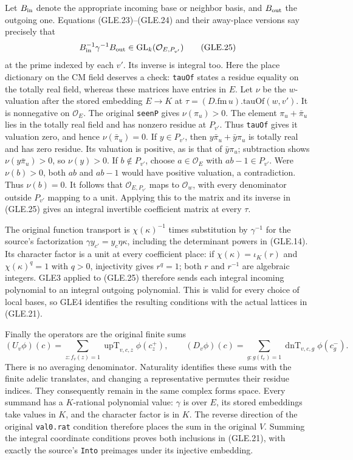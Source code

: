 Let $B_{\rm in}$ denote the appropriate incoming base or neighbor
basis, and $B_{\rm out}$ the outgoing one.  Equations (GLE.23)--(GLE.24)
and their away-place versions say precisely that
\[
       B_{\rm in}^{-1}\gamma^{-1}B_{\rm out}
                \in\mathrm{GL}_k(\mathcal O_{E,P_{v'}})
 \tag{GLE.25}
\]
at the prime indexed by each $v'$.  Its inverse is integral too.
Here the place dictionary on the CM field deserves a check:
\texttt{tauOf} states a residue equality on the totally real field,
whereas these matrices have entries in $E$.  Let $\nu$ be the
$w$-valuation after the stored embedding $E\to K$ at
$\tau=(D.\mathrm{fm}\,u).\mathrm{tauOf}(w,v')$.  It is nonnegative on
$\mathcal O_E$.  The original \texttt{seenP} gives $\nu(\pi_u)>0$.
The element $\pi_u+\bar\pi_u$ lies in the totally real field and has
nonzero residue at $P_{v'}$.  Thus \texttt{tauOf} gives it valuation
zero, and hence $\nu(\bar\pi_u)=0$.  If $y\in P_{v'}$, then
$y\bar\pi_u+\bar y\pi_u$ is totally real and has zero residue.
Its valuation is positive, as is that of $\bar y\pi_u$; subtraction
shows $\nu(y\bar\pi_u)>0$, so $\nu(y)>0$.
If $b\notin P_{v'}$, choose $a\in\mathcal O_E$ with
$ab-1\in P_{v'}$.  Were $\nu(b)>0$, both $ab$ and $ab-1$ would have
positive valuation, a contradiction.  Thus $\nu(b)=0$.
It follows that $\mathcal O_{E,P_{v'}}$ maps to $\mathcal O_w$,
with every denominator outside $P_{v'}$ mapping to a unit.  Applying
this to the matrix and its inverse in (GLE.25) gives an integral
invertible coefficient matrix at every $\tau$.

The original function transport is
$\chi(\kappa)^{-1}$ times substitution by $\gamma^{-1}$ for the
source's factorization $\gamma y_{c'}=y_c\eta\kappa$, including
the determinant powers in (GLE.14).  Its character factor is a unit
at every coefficient place: if $\chi(\kappa)=\iota_K(r)$ and
$\chi(\kappa)^q=1$ with $q>0$, injectivity gives $r^q=1$;
both $r$ and $r^{-1}$ are algebraic integers.  GLE3 applied to
(GLE.25) therefore sends each integral incoming polynomial to an
integral outgoing polynomial.  This is valid for every choice of
local bases, so GLE4 identifies the resulting conditions with the
actual lattices in (GLE.21).

Finally the operators are the original finite sums
\[
 (U_v\phi)(c)=\sum_{z:f_v(z)=1}\operatorname{upT}_{v,c,z}
                         \phi(c^+_z),\qquad
 (D_v\phi)(c)=\sum_{g:g(t_e)=1}\operatorname{dnT}_{v,c,g}
                         \phi(c^-_g).             \tag{GLE.26}
\]
There is no averaging denominator.  Naturality identifies these sums
with the finite adelic translates, and changing a representative
permutes their residue indices.  They consequently remain in the
same complex forms space.  Every summand has a $K$-rational
polynomial value: $\gamma$ is over $E$, its stored embeddings take
values in $K$, and the character factor is in $K$.  The reverse
direction of the original \texttt{val0.rat} condition therefore places
the sum in the original $V$.  Summing the integral coordinate
conditions proves both inclusions in (GLE.21), with exactly the
source's \texttt{Into} preimages under its injective embedding.

